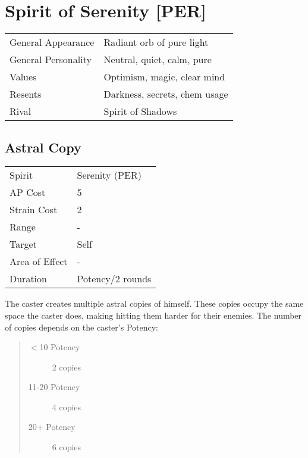 \documentclass[11pt,a4paper,twocolumn]{book}
\begin{document}
\section*{Spirit of Serenity [PER]}
{
	\begin{tabu} to 75mm{| X[l,4] | X[l,8] |}
		\hline
		General Appearance  & Radiant orb of pure light     \\
		General Personality & Neutral, quiet, calm, pure    \\
		Values              & Optimism, magic, clear mind   \\
		Resents             & Darkness, secrets, chem usage \\
		Rival               & Spirit of Shadows             \\ \hline
	\end{tabu}
	
}
\medskip
\vfill

\subsection*{Astral Copy}
{
	\begin{tabu} to 70mm{| X[l,4] | X[l,7] |}
		\hline
		Spirit         & Serenity (PER)        \\
		AP Cost        & 5                     \\
		Strain Cost    & 2                     \\
		Range          & -                     \\
		Target         & Self                  \\
		Area of Effect & -                     \\
		Duration       & Potency/2 rounds \\ \hline
	\end{tabu}
	
}
\medskip

The caster creates multiple astral copies of himself. These copies occupy the same space the caster does, making hitting them harder for their enemies. The number of copies depends on the caster's Potency:

\begin{quote}
	\begin{description}
		\item[$<$10 Potency] 	2 copies
		\item[11-20 Potency] 4 copies
		\item[20+ Potency] 	    6 copies
	\end{description}	
\end{quote}
\end{document}
